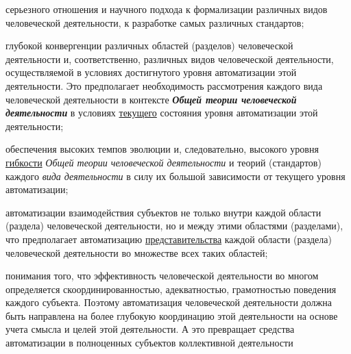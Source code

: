 \begin{scnsubstruct}
{\begin{scnitemize}
            \item серьезного отношения и научного подхода к формализации различных видов человеческой деятельности, к разработке самых различных стандартов;
            \item глубокой конвергенции различных областей (разделов) человеческой деятельности и, соответственно, различных видов человеческой деятельности, осуществляемой в условиях достигнутого уровня автоматизации этой деятельности. Это предполагает необходимость рассмотрения каждого вида человеческой деятельности в контексте \textbf{\textit{Общей теории человеческой деятельности}} в условиях \underline{текущего} состояния уровня автоматизации этой деятельности;
            \item обеспечения высоких темпов эволюции и, следовательно, высокого уровня \underline{гибкости} \textit{Общей теории человеческой деятельности} и теорий (стандартов) каждого \textit{вида деятельности} в силу их большой зависимости от текущего уровня автоматизации;
            \item автоматизации взаимодействия субъектов не только внутри каждой области (раздела) человеческой деятельности, но и между этими областями (разделами), что предполагает автоматизацию \underline{представительства} каждой области (раздела) человеческой деятельности во множестве всех таких областей;
            \item понимания того, что эффективность человеческой деятельности во многом определяется скоординированностью, адекватностью, грамотностью поведения каждого субъекта. Поэтому автоматизация человеческой деятельности должна быть направлена на более глубокую координацию этой деятельности на основе учета смысла и целей этой деятельности. А это превращает средства автоматизации в полноценных субъектов коллективной деятельности
        \end{scnitemize}
    }
    \bigskip\bigskip{}
\end{scnsubstruct}
